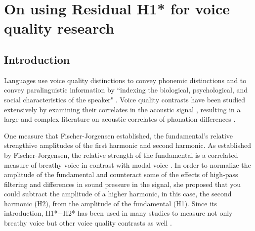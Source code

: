 
\chapter{On using Residual H1* for voice quality research} \label{ch:residual_h1}
\section{Introduction} \label{sec:Intro}

Languages use voice quality distinctions to convey phonemic distinctions \citep{garellekPhoneticsVoice2019} and to convey paralinguistic information by ``indexing the biological, psychological, and social characteristics of the speaker" \citep{laverVoiceQualityIndexical1968,podesvaStanceWindowLanguageRace2016}. Voice quality contrasts have been studied extensively by examining their correlates in the acoustic signal \citep[e.g.,][]{espositoCrossLinguisticPatterns2020}, resulting in a large and complex literature on acoustic correlates of phonation differences \citep[see][]{garellekPhoneticsVoice2019}. 

One measure that Fischer-Jorgensen established, the fundamental's relative strengthive amplitudes of the first harmonic and second harmonic. As established by Fischer-Jorgensen, the relative strength of the fundamental is a correlated measure of breathy voice in contrast with modal voice \citet{fischer-jorgensenPhoneticAnalysisBreathy1968}. In order to normalize the amplitude of the fundamental and counteract some of the effects of high-pass filtering and differences in sound pressure in the signal, she proposed that you could subtract the amplitude of a higher harmonic, in this case, the second harmonic (H2), from the amplitude of the fundamental (H1). Since its introduction, H1*$-$H2* has been used in many studies to measure not only breathy voice but other voice quality contrasts as well \citep{garellekPhoneticsVoice2019,chaiH1H2Acoustic2022}.

